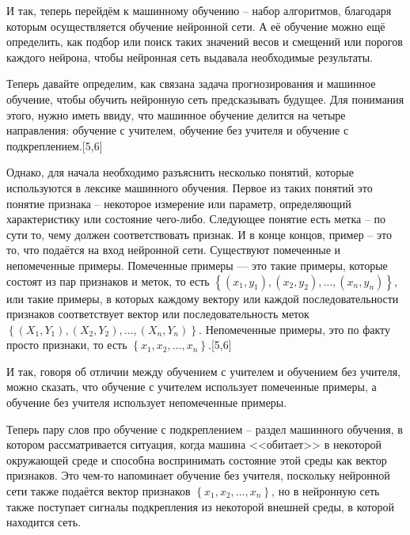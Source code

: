 {  \par \redline И так, теперь перейдём к машинному обучению – набор алгоритмов, благодаря которым осуществляется обучение нейронной сети. А её обучение можно ещё определить, как подбор или поиск таких значений весов и смещений или порогов каждого нейрона, чтобы нейронная сеть выдавала необходимые результаты.

  \par \redline Теперь давайте определим, как связана задача прогнозирования и машинное обучение, чтобы обучить нейронную сеть предсказывать будущее. Для понимания этого, нужно иметь ввиду, что машинное обучение делится на четыре направления: обучение с учителем, обучение без учителя и обучение с подкреплением.[5,6]

  \par \redline Однако, для начала необходимо разъяснить несколько понятий, которые используются в лексике машинного обучения. Первое из таких понятий это понятие признака {--} некоторое измерение или параметр, определяющий характеристику или состояние чего-либо. Следующее понятие есть метка {--} по сути то, чему должен соответствовать признак.  И в конце концов, пример {--} это то, что подаётся на вход нейронной сети. Существуют помеченные и непомеченные примеры. Помеченные примеры — это такие примеры, которые состоят из пар признаков и меток, то есть $\left\{\left(x_{1}, y_{1}\right), \left(x_{2}, y_{2}\right), \dots, \left(x_{n}, y_{n}\right)\right\}$, или такие примеры, в которых каждому вектору или каждой последовательности признаков соответствует вектор или последовательность меток $\left\{\left(X_{1}, Y_{1}\right), \left(X_{2}, Y_{2}\right), \dots, \left(X_{n}, Y_{n}\right)\right\}$. Непомеченные примеры, это по факту просто признаки, то есть $\left\{x_{1}, x_{2}, \dots, x_{n}\right\}$.[5,6]

  \par \redline И так, говоря об отличии между обучением с учителем и обучением без учителя, можно сказать, что обучение с учителем использует помеченные примеры, а обучение без учителя использует непомеченные примеры.

  \par \redline Теперь пару слов про обучение с подкреплением {--} раздел машинного обучения, в котором рассматривается ситуация, когда машина <<обитает>> в некоторой окружающей среде и способна воспринимать состояние этой среды как вектор признаков. Это чем-то напоминает обучение без учителя, поскольку нейронной сети также подаётся вектор признаков $\left\{x_{1}, x_{2}, \dots, x_{n}\right\}$, но в нейронную сеть также поступает сигналы подкрепления из некоторой внешней среды, в которой находится сеть.

}
